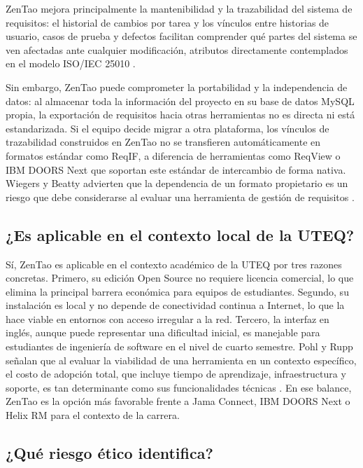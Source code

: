 \documentclass[journal,onecolumn]{IEEEtran}
\begin{document}
ZenTao mejora principalmente la mantenibilidad y la trazabilidad
del sistema de requisitos: el historial de cambios por tarea y los vínculos entre historias de
usuario, casos de prueba y defectos facilitan comprender qué partes del sistema se ven afectadas
ante cualquier modificación, atributos directamente contemplados en el modelo ISO/IEC 25010
\cite{iso25010}.

Sin embargo, ZenTao puede comprometer la portabilidad y la independencia
de datos: al almacenar toda la información del proyecto en su base de datos MySQL propia,
la exportación de requisitos hacia otras herramientas no es directa ni está estandarizada. Si el
equipo decide migrar a otra plataforma, los vínculos de trazabilidad construidos en ZenTao
no se transfieren automáticamente en formatos estándar como ReqIF, a diferencia de herramientas
como ReqView o IBM DOORS Next que soportan este estándar de intercambio de forma nativa.
Wiegers y Beatty advierten que la dependencia de un formato propietario es un riesgo que
debe considerarse al evaluar una herramienta de gestión de requisitos \cite{wiegers2013}.

\subsection{¿Es aplicable en el contexto local de la UTEQ?}

Sí, ZenTao es aplicable en el contexto académico de la UTEQ por tres razones concretas. Primero,
su edición Open Source no requiere licencia comercial, lo que elimina la principal barrera
económica para equipos de estudiantes. Segundo, su instalación es local y no depende de
conectividad continua a Internet, lo que la hace viable en entornos con acceso irregular a la red.
Tercero, la interfaz en inglés, aunque puede representar una dificultad inicial, es manejable para
estudiantes de ingeniería de software en el nivel de cuarto semestre. Pohl y Rupp señalan que
al evaluar la viabilidad de una herramienta en un contexto específico, el costo de adopción total,
que incluye tiempo de aprendizaje, infraestructura y soporte, es tan determinante como sus
funcionalidades técnicas \cite{pohl2015}. En ese balance, ZenTao es la opción más favorable
frente a Jama Connect, IBM DOORS Next o Helix RM para el contexto de la carrera.

\subsection{¿Qué riesgo ético identifica?}
\end{document}
